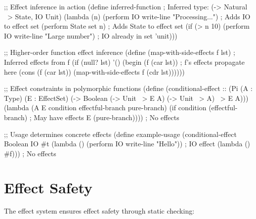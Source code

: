 \begin{example}
\begin{lambdustcode}
;; Effect inference in action
(define inferred-function   ; Inferred type: (-> Natural ~> {State, IO} Unit)
  (lambda (n)
    (perform IO write-line "Processing...")    ; Adds IO to effect set
    (perform State set n)                      ; Adds State to effect set
    (if (> n 10)
        (perform IO write-line "Large number") ; IO already in set
        'unit)))

;; Higher-order function effect inference
(define (map-with-side-effects f lst)    ; Inferred effects from f
  (if (null? lst)
      '()
      (begin 
        (f (car lst))                    ; f's effects propagate here
        (cons (f (car lst)) 
              (map-with-side-effects f (cdr lst))))))

;; Effect constraints in polymorphic functions
(define (conditional-effect :: (Pi (A : Type) (E : EffectSet)
                                  (-> Boolean (-> Unit ~> E A) (-> Unit ~> {} A) ~> E A)))
  (lambda (A E condition effectful-branch pure-branch)
    (if condition 
        (effectful-branch)    ; May have effects E
        (pure-branch))))      ; No effects

;; Usage determines concrete effects
(define example-usage 
  (conditional-effect Boolean {IO}
                     #t
                     (lambda () (perform IO write-line "Hello"))  ; IO effect
                     (lambda () #f)))                             ; No effects
\end{lambdustcode}
\end{example}

\section{Effect Safety}
\label{sec:effect-safety}


The effect system ensures effect safety through static checking:

